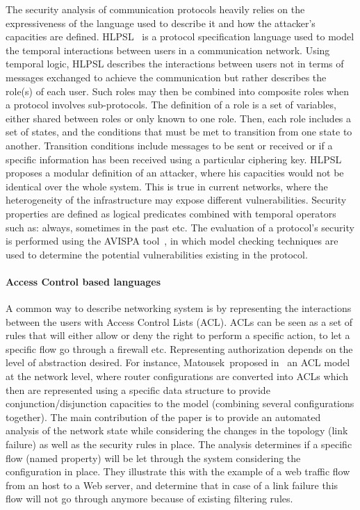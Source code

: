 The security analysis of communication protocols heavily relies on the expressiveness of the language used to describe it and how the attacker's capacities are defined. HLPSL~\cite{HLPSL-Chevalier2004} is a protocol specification language used to model the temporal interactions between users in a communication network. Using temporal logic, HLPSL describes the interactions between users not in terms of messages exchanged to achieve the communication but rather describes the role(s) of each user. Such roles may then be combined into composite roles when a protocol involves sub-protocols.
The definition of a role is a set of variables, either shared between roles or only known to one role.
Then, each role includes a set of states, and the conditions that must be met to transition from one state to another. Transition conditions include messages to be sent or received or if a specific information has been received using a particular ciphering key.
HLPSL proposes a modular definition of an attacker, where his capacities would not be identical over the whole system.
This is true in current networks, where the heterogeneity of the infrastructure may expose different vulnerabilities.
Security properties are defined as logical predicates combined with temporal operators such as: always, sometimes in the past etc.
The evaluation of a protocol's security is performed using the AVISPA tool~\cite{avispa}, in which model checking techniques are used to determine the potential vulnerabilities existing in the protocol.

\paragraph{Access Control based languages}
A common way to describe networking system is by representing the interactions between the users with Access Control Lists (ACL).
ACLs can be seen as a set of rules that will either allow or deny the right to perform a specific action, to let a specific flow go through a firewall etc.
Representing authorization depends on the level of abstraction desired.
For instance, Matousek~\etal proposed in~\cite{Matousek2008} an ACL model at the network level, where router configurations are converted into ACLs which then are represented using a specific data structure to provide conjunction/disjunction capacities to the model (\ie combining several configurations together).
The main contribution of the paper is to provide an automated analysis of the network state while considering the changes in the topology (\ie link failure) as well as the security rules in place.
The analysis determines if a specific flow (named property) will be let through the system considering the configuration in place. They illustrate this with the example of a web traffic flow from an host to a Web server, and determine that in case of a link failure this flow will not go through anymore because of existing filtering rules.

